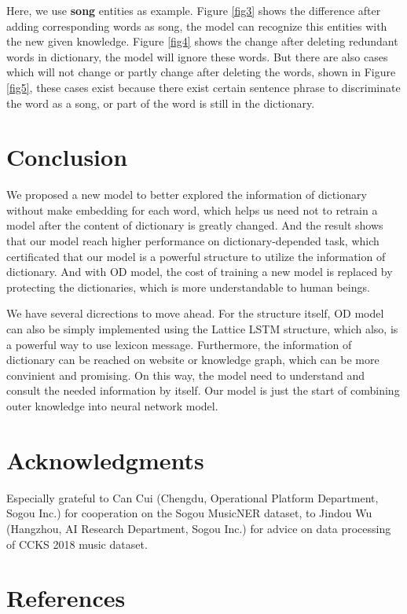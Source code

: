 \documentclass[letterpaper]{article} %
\begin{document}
Here, we use \textbf{song} entities as example. Figure \ref{fig3} shows the difference after adding corresponding words as song, the model can recognize this entities with the new given knowledge. Figure \ref {fig4} shows the change after deleting redundant words in dictionary, the model will ignore these words. But there are also cases which will not change or partly change after deleting the words, shown in Figure \ref{fig5},  these cases exist because there exist certain sentence phrase to discriminate the word as a song,  or part of the word is still in the dictionary.



\section{Conclusion}

We proposed a new model to better explored the information of dictionary without make embedding for each word, which helps us need not to retrain a model after the content of dictionary is greatly changed. And the result shows that our model reach higher performance on dictionary-depended task, which certificated that our model is a powerful structure to utilize the information of dictionary. And with OD model, the cost of training a new model is replaced by protecting the dictionaries, which is more understandable to human beings.

We have several dicrections to move ahead. For the structure itself, OD model can also be simply implemented using the Lattice LSTM structure, which also, is a powerful way to use lexicon message. Furthermore, the information of dictionary can be reached on website or knowledge graph, which can be more convinient and promising. On this way, the model need to understand and consult the needed information by itself. Our model is just the start of combining outer knowledge into neural network model. 

\section{ Acknowledgments }
Especially grateful to Can Cui (Chengdu, Operational Platform Department, Sogou Inc.) for cooperation on the Sogou MusicNER dataset, to Jindou Wu (Hangzhou, AI Research Department, Sogou Inc.) for advice on data processing of CCKS 2018 music dataset.

\section{References}
\end{document}
